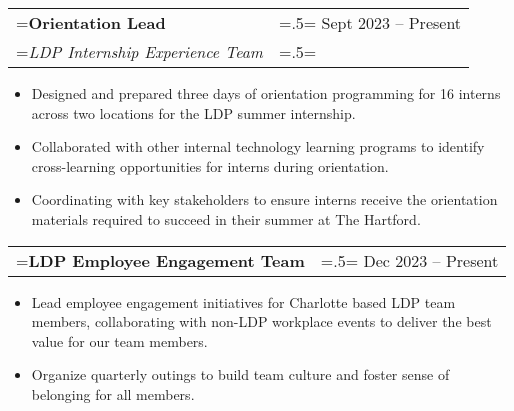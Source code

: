 \documentclass{article}
\begin{document}
\hspace{-1em}
\begin{tabularx}{\textwidth}{
    >{\raggedright\arraybackslash\hsize=1.5\hsize\linewidth=\hsize}X
    >{\raggedleft\arraybackslash\hsize=.5\hsize\linewidth=\hsize}X }
    \textbf{Orientation Lead} & Sept 2023 -- Present\\
    \textit{LDP Internship Experience Team} & \\
\end{tabularx}
\vspace{-.5em}
\begin{itemize}[label={--}, leftmargin=1em]
    \setlength\itemsep{0em}
    \item Designed and prepared three days of orientation programming for 16 interns across two locations for the LDP summer internship.
    \item Collaborated with other internal technology learning programs to identify cross-learning opportunities for interns during orientation.
    \item Coordinating with key stakeholders to ensure interns receive the orientation materials required to succeed in their summer at The Hartford.
\end{itemize}

\hspace{-1em}
\begin{tabularx}{\textwidth}{
    >{\raggedright\arraybackslash\hsize=1.5\hsize\linewidth=\hsize}X
    >{\raggedleft\arraybackslash\hsize=.5\hsize\linewidth=\hsize}X }
    \textbf{LDP Employee Engagement Team} & Dec 2023 -- Present\\
\end{tabularx}
\vspace{-.5em}
\begin{itemize}[label={--}, leftmargin=1em]
    \setlength\itemsep{0em}
    \item Lead employee engagement initiatives for Charlotte based LDP team members, collaborating with non-LDP workplace events to deliver the best value for our team members.
    \item Organize quarterly outings to build team culture and foster sense of belonging for all members.
\end{itemize}
\end{document}
